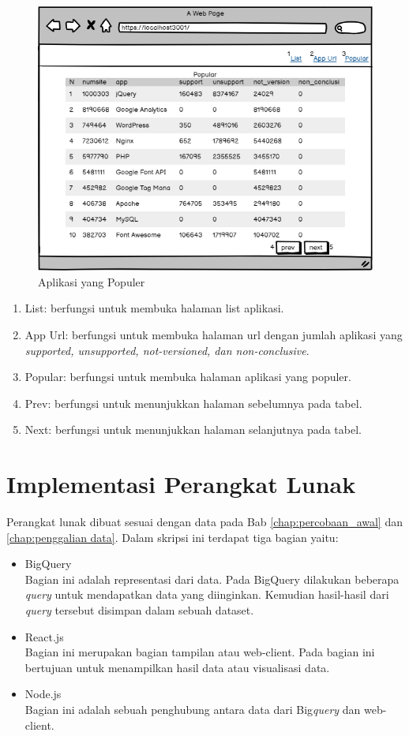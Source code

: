 \begin{figure}[H]
	\centering  
	\includegraphics[scale=0.7]{Gambar/popular.png}  
	\caption{Aplikasi yang Populer} 
	\label{fig:popular} 
\end{figure}
\begin{enumerate}
	\item List: berfungsi untuk membuka halaman list aplikasi.
	\item App Url: berfungsi untuk membuka halaman url dengan jumlah aplikasi yang \textit{supported, unsupported, not-versioned, dan non-conclusive}.
	\item Popular: berfungsi untuk membuka halaman aplikasi yang populer.
	\item Prev: berfungsi untuk menunjukkan halaman sebelumnya pada tabel.
	\item Next: berfungsi untuk menunjukkan halaman selanjutnya pada tabel. 
\end{enumerate}

\section{Implementasi Perangkat Lunak}
Perangkat lunak dibuat sesuai dengan data pada Bab \ref{chap:percobaan_awal} dan \ref{chap:penggalian data}. Dalam skripsi ini terdapat tiga bagian yaitu:
\begin{itemize}
	\item BigQuery\\
	Bagian ini adalah representasi dari data. Pada BigQuery dilakukan beberapa \textit{query} untuk mendapatkan data yang diinginkan. Kemudian hasil-hasil dari \textit{query} tersebut disimpan dalam sebuah dataset.
	\item React.js\\
	Bagian ini merupakan bagian tampilan atau web-client. Pada bagian ini bertujuan untuk menampilkan hasil data atau visualisasi data.
	\item Node.js\\
	Bagian ini adalah sebuah penghubung antara data dari Big\textit{query} dan web-client.
\end{itemize}

